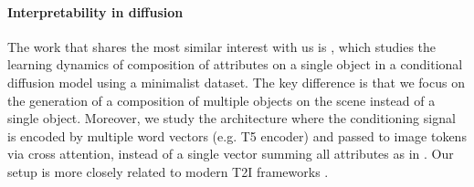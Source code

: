 \documentclass[10pt,twocolumn,letterpaper]{article}
\begin{document}
 


\paragraph{Interpretability in diffusion}

The work that shares the most similar interest with us is \citep{Okawa2024Compositional,Park2024Emergence}, which studies the learning dynamics of composition of attributes on a single object in a conditional diffusion model using a minimalist dataset. The key difference is that we focus on the generation of a composition of multiple objects on the scene instead of a single object. Moreover, we study the architecture where the conditioning signal is encoded by multiple word vectors (e.g. T5 encoder) and passed to image tokens via cross attention, instead of a single vector summing all attributes as in \cite{Okawa2024Compositional}. Our setup is more closely related to modern T2I frameworks \citep{chen2023PixArtAlpha,Rombach2022LatentDiffusion,Xie2024SANA}.
\end{document}
